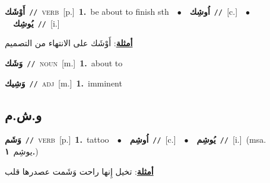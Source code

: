 \documentclass[10pt,a4paper,twoside]{article} %
\begin{document}
\begin{multicols}{2}
{\setlength\topsep{0pt}\textbf{\foreignlanguage{arabic}{أَوْشَك}}\ {\color{gray}\texttt{//}\color{black}}\ \textsc{verb}\ [p.]\ \textbf{1.}~be about to finish sth\ \ $\bullet$\ \ \setlength\topsep{0pt}\textbf{\foreignlanguage{arabic}{اُوشِك}}\ {\color{gray}\texttt{//}\color{black}}\ [c.]\ \ $\bullet$\ \ \setlength\topsep{0pt}\textbf{\foreignlanguage{arabic}{يُوشِك}}\ {\color{gray}\texttt{//}\color{black}}\ [i.]\  \begin{flushright}\color{gray}\foreignlanguage{arabic}{\textbf{\underline{\foreignlanguage{arabic}{أمثلة}}}: أَوْشَك على الانتهاء من التصميم}\end{flushright}\color{black}} \vspace{2mm}

{\setlength\topsep{0pt}\textbf{\foreignlanguage{arabic}{وَشَك}}\ {\color{gray}\texttt{//}\color{black}}\ \textsc{noun}\ [m.]\ \textbf{1.}~about to\ } \vspace{2mm}

{\setlength\topsep{0pt}\textbf{\foreignlanguage{arabic}{وَشِيك}}\ {\color{gray}\texttt{//}\color{black}}\ \textsc{adj}\ [m.]\ \textbf{1.}~imminent\ } \vspace{2mm}

\vspace{-3mm}
\subsection*{\color{blue}\foreignlanguage{arabic}{و.ش.م}\color{blue}{}} 

{\setlength\topsep{0pt}\textbf{\foreignlanguage{arabic}{وَشَم}}\ {\color{gray}\texttt{//}\color{black}}\ \textsc{verb}\ [p.]\ \textbf{1.}~tattoo\ \ $\bullet$\ \ \setlength\topsep{0pt}\textbf{\foreignlanguage{arabic}{اُوشِم}}\ {\color{gray}\texttt{//}\color{black}}\ [c.]\ \ $\bullet$\ \ \setlength\topsep{0pt}\textbf{\foreignlanguage{arabic}{يُوشِم}}\ {\color{gray}\texttt{//}\color{black}}\ [i.]\ \color{gray}(msa. \foreignlanguage{arabic}{يوشِم}~\foreignlanguage{arabic}{\textbf{١.}})\color{black}\  \begin{flushright}\color{gray}\foreignlanguage{arabic}{\textbf{\underline{\foreignlanguage{arabic}{أمثلة}}}: تخيل إِنها راحت وَشَمت عصدرها قلب}\end{flushright}\color{black}} \vspace{2mm}


\end{multicols}
\end{document}

